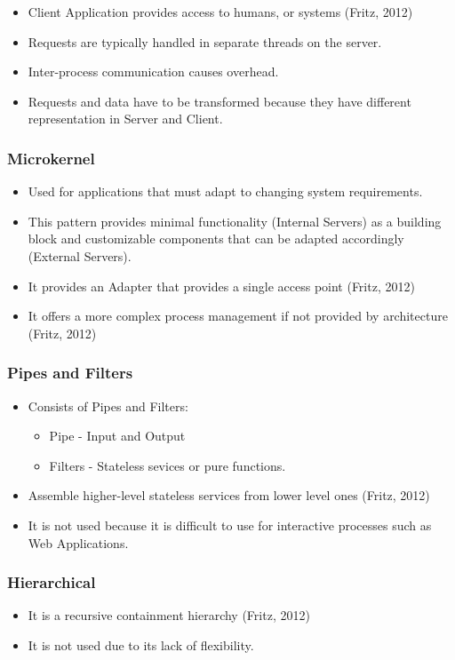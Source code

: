 \documentclass[a4paper,12pt]{article}
\begin{document}
\begin{itemize}

\item Client Application provides access to humans, or systems (Fritz, 2012)
\item Requests are typically handled in separate threads on the server.
\item Inter-process communication causes overhead.
\item Requests and data have to be transformed because they have different representation in Server and Client.
\end{itemize}

\subsubsection{Microkernel}
\begin{itemize}
\item Used for applications that must adapt to changing system requirements.
\item This pattern provides minimal functionality (Internal Servers) as a building block and customizable components that can be adapted accordingly (External Servers).
\item It provides an Adapter that provides a single access point (Fritz, 2012)
\item It offers a more complex process management if not provided by architecture (Fritz, 2012)
\end{itemize}

\subsubsection{Pipes and Filters}
\begin{itemize}
\item Consists of Pipes and Filters:
\begin{itemize}
\item Pipe - Input and Output
\item Filters - Stateless sevices or pure functions.
\end{itemize}
\item Assemble higher-level stateless services from lower level ones (Fritz, 2012)
\item It is not used because it is difficult to use for interactive processes such as Web Applications.

\end{itemize}

\subsubsection{Hierarchical}
\begin{itemize}
\item It is a recursive containment hierarchy (Fritz, 2012)
\item It is not used due to its lack of flexibility.
\end{itemize}
\end{document}
